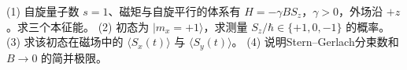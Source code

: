 (1) 自旋量子数 \(s=1\)、磁矩与自旋平行的体系有 \(H=-\gamma BS_z\)，\(\gamma>0\)，外场沿 \(+z\)。求三个本征能。
(2) 初态为 \(|m_x=+1\rangle\)，求测量 \(S_z/\hbar\in\{+1,0,-1\}\) 的概率。
(3) 求该初态在磁场中的 \(\langle S_x(t)\rangle\) 与 \(\langle S_y(t)\rangle\)。
(4) 说明Stern–Gerlach分束数和 \(B\to0\) 的简并极限。
